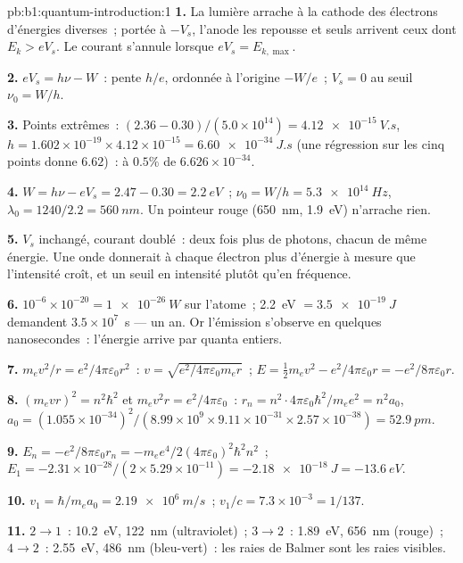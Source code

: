\begin{solution}{pb:b1:quantum-introduction:1}
\textbf{1.} La lumière arrache à la cathode des électrons d'énergies
diverses~; portée à $-V_s$, l'anode les repousse et seuls arrivent ceux dont
$E_k > eV_s$. Le courant s'annule lorsque $eV_s = E_{k,\max}$.

\textbf{2.} $eV_s = h\nu - W$~: pente $h/e$, ordonnée à l'origine $-W/e$~; $V_s = 0$ au
seuil $\nu_0 = W/h$.

\textbf{3.} Points extrêmes~: $(2.36 - 0.30)/(5.0 \times 10^{14}) = \qty{4.12e-15}{V.s}$,
$h = 1.602 \times 10^{-19} \times 4.12 \times 10^{-15} = \qty{6.60e-34}{J.s}$ (une régression
sur les cinq points donne $6.62$)~: à $0.5\%$ de $6.626 \times 10^{-34}$.

\textbf{4.} $W = h\nu - eV_s = 2.47 - 0.30 = \qty{2.2}{eV}$~; $\nu_0 = W/h =
\qty{5.3e14}{Hz}$, $\lambda_0 = 1240/2.2 = \qty{560}{nm}$. Un pointeur rouge
(\qty{650}{nm}, \qty{1.9}{eV}) n'arrache rien.

\textbf{5.} $V_s$ inchangé, courant doublé~: deux fois plus de photons, chacun
de même énergie. Une onde donnerait à chaque électron plus d'énergie à mesure
que l'intensité croît, et un seuil en intensité plutôt qu'en fréquence.

\textbf{6.} $10^{-6} \times 10^{-20} = \qty{1e-26}{W}$ sur l'atome~; \qty{2.2}{eV} $=
\qty{3.5e-19}{J}$ demandent $3.5 \times 10^7$~s --- un an. Or l'émission s'observe
en quelques nanosecondes~: l'énergie arrive par quanta entiers.

\textbf{7.} $m_ev^2/r = e^2/4\pi\varepsilon_0r^2$~: $v = \sqrt{e^2/4\pi\varepsilon_0m_er}$~; $E =
\tfrac12m_ev^2 - e^2/4\pi\varepsilon_0r = -e^2/8\pi\varepsilon_0r$.

\textbf{8.} $(m_evr)^2 = n^2\hbar^2$ et $m_ev^2r = e^2/4\pi\varepsilon_0$~: $r_n = n^2 \cdot
4\pi\varepsilon_0\hbar^2/m_ee^2 = n^2a_0$, $a_0 = (1.055 \times 10^{-34})^2/(8.99 \times 10^9
\times 9.11 \times 10^{-31} \times 2.57 \times 10^{-38}) = \qty{52.9}{pm}$.

\textbf{9.} $E_n = -e^2/8\pi\varepsilon_0r_n = -m_ee^4/2(4\pi\varepsilon_0)^2\hbar^2n^2$~; $E_1 =
-2.31 \times 10^{-28}/(2 \times 5.29 \times 10^{-11}) = \qty{-2.18e-18}{J} = \qty{-13.6}{eV}$.

\textbf{10.} $v_1 = \hbar/m_ea_0 = \qty{2.19e6}{m/s}$~; $v_1/c = 7.3 \times 10^{-3} =
1/137$.

\textbf{11.} $2 \to 1$~: \qty{10.2}{eV}, \qty{122}{nm} (ultraviolet)~; $3 \to 2$~:
\qty{1.89}{eV}, \qty{656}{nm} (rouge)~; $4 \to 2$~: \qty{2.55}{eV}, \qty{486}{nm}
(bleu-vert)~: les raies de Balmer sont les raies visibles.


\end{solution}
